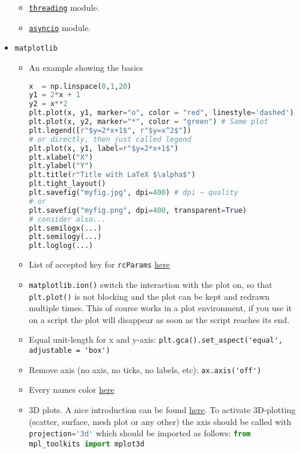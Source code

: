 \documentclass[a4paper,12pt,%
              final%
              ]{article}
\begin{document}
\begin{itemize}
\begin{itemize}
\begin{itemize}
        \end{itemize}
      \item \href{https://docs.python.org/3/library/threading.html}{\texttt{threading}} module.
      \item \href{https://docs.python.org/3/library/asyncio.html}{\texttt{asyncio}} module.
    \end{itemize}
  \item \texttt{matplotlib}
    \begin{itemize}
      \item An example showing the basics
\begin{lstlisting}[language=python]
x  = np.linspace(0,1,20)
y1 = 2*x + 1
y2 = x**2
plt.plot(x, y1, marker="o", color = "red", linestyle='dashed')
plt.plot(x, y2, marker="*", color = "green") # Same plot
plt.legend([r"$y=2*x+1$", r"$y=x^2$"])
# or directly, then just called legend
plt.plot(x, y1, label=r"$y=2*x+1$")
plt.xlabel("X")
plt.ylabel("Y")
plt.title(r"Title with LaTeX $\alpha$")
plt.tight_layout()
plt.savefig("myfig.jpg", dpi=400) # dpi ~ quality
# or
plt.savefig("myfig.png", dpi=400, transparent=True)
# consider also...
plt.semilogx(...)
plt.semilogy(...)
plt.loglog(...)
\end{lstlisting}
      \item List of accepted key for \texttt{rcParams} \href{https://matplotlib.org/stable/api/matplotlib_configuration_api.html#matplotlib.rcParams}{here}
      \item \texttt{matplotlib.ion()} switch the interaction with the plot on, so that \texttt{plt.plot()} is not blocking and the plot can be kept and redrawn multiple times. This of course works in a plot environment, if you use it on a script the plot will disappear as soon as the script reaches its end.
      \item Equal unit-length for x and y-axis: \verb|plt.gca().set_aspect('equal', adjustable = 'box')|
      \item Remove axis (no axis, no ticks, no labels, etc): \verb|ax.axis('off')|
      \item Every names color \href{https://matplotlib.org/stable/gallery/color/named_colors.html}{here}
      \item 3D plots. A nice introduction can be found \href{https://jakevdp.github.io/PythonDataScienceHandbook/04.12-three-dimensional-plotting.html}{here}. To activate 3D-plotting (scatter, surface, mesh plot or any other) the axis should be called with \lstinline[language=python]{projection='3d'} which should be imported as follows: \lstinline[language=python]{from mpl_toolkits import mplot3d}

\end{itemize}
\end{itemize}
\end{document}
